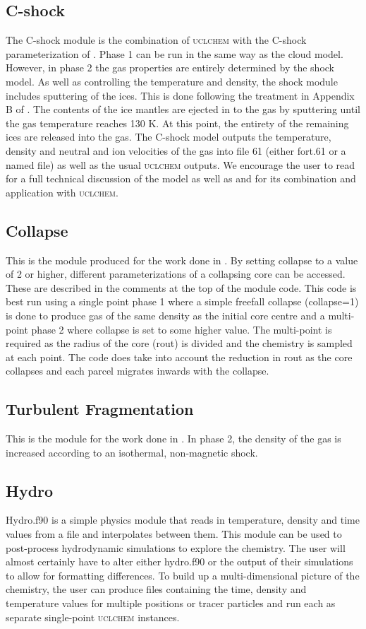 \documentclass{llncs}
\begin{document}
\subsection{C-shock}
The C-shock module is the combination of \textsc{uclchem} with the C-shock parameterization of \citet{jimenez2008}. Phase 1 can be run in the same way as the cloud model. However, in phase 2 the gas properties are entirely determined by the shock model. As well as controlling the temperature and density, the shock module includes sputtering of the ices. This is done following the treatment in Appendix B of \citet{jimenez2008}. The contents of the ice mantles are ejected in to the gas by sputtering until the gas temperature reaches 130 K. At this point, the entirety of the remaining ices are released into the gas. The C-shock model outputs the temperature, density and neutral and ion velocities of the gas into file 61 (either fort.61 or a named file) as well as the usual \textsc{uclchem} outputs. We encourage the user to read \citet{jimenez2008} for a full technical discussion of the model as well as \citet{viti2011} and \citet{Holdship2016b} for its combination and application with \textsc{uclchem}.
%
\subsection{Collapse}
This is the module produced for the work done in \citet{Priestley2018}. By setting collapse to a value of 2 or higher, different parameterizations of a collapsing core can be accessed. These are described in the comments at the top of the module code. This code is best run using a single point phase 1 where a simple freefall collapse (collapse=1) is done to produce gas of the same density as the initial core centre and a multi-point phase 2 where collapse is set to some higher value. The multi-point is required as the radius of the core (rout) is divided and the chemistry is sampled at each point. The code does take into account the reduction in rout as the core collapses and each parcel migrates inwards with the collapse.
%
\subsection{Turbulent Fragmentation}
This is the module for the work done in \citet{Holdship2015}. In phase 2, the density of the gas is increased according to an isothermal, non-magnetic shock. 
%
\subsection{Hydro}
Hydro.f90 is a simple physics module that reads in temperature, density and time values from a file and interpolates between them. This module can be used to post-process hydrodynamic simulations to explore the chemistry. The user will almost certainly have to alter either hydro.f90 or the output of their simulations to allow for formatting differences. To build up a multi-dimensional picture of the chemistry, the user can produce files containing the time, density and temperature values for multiple positions or tracer particles and run each as separate single-point \textsc{\textsc{uclchem}} instances.
\end{document}
